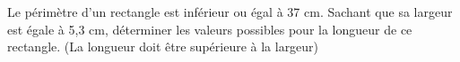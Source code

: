 
Le périmètre d’un rectangle est inférieur ou égal à 37 cm. Sachant que sa largeur est égale à 5,3 cm, déterminer les valeurs possibles pour la longueur de ce rectangle. (La longueur doit être supérieure à la largeur) 